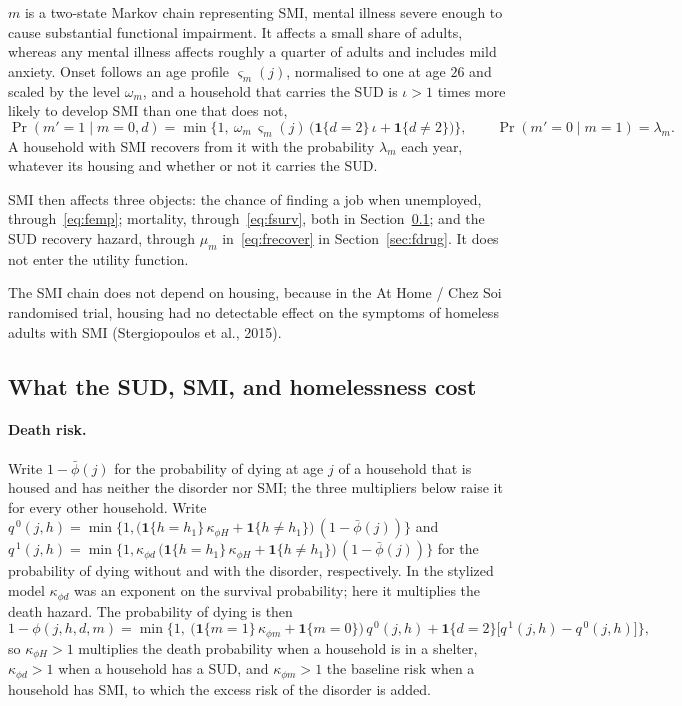 \documentclass[10pt]{article}
\begin{document}
$m$ is a two-state Markov chain representing SMI, mental illness severe enough to cause substantial functional impairment. It affects a small share of adults, whereas any
mental illness affects roughly a quarter of adults and includes mild anxiety. Onset
follows an age profile $\varsigma_m(j)$, normalised to one at age $26$ and scaled by the level
$\omega_m$, and a household that carries the SUD is $\iota>1$ times more likely to develop SMI than one that does not,
\begin{equation}\label{eq:fonset}
\Pr(m'=1\mid m=0,d)=\min\big\{1,\ \omega_m\,\varsigma_m(j)\,\big(\mathbf{1}\{d=2\}\,\iota+\mathbf{1}\{d\neq2\}\big)\big\},
\qquad
\Pr(m'=0\mid m=1)=\lambda_m .
\end{equation}
A household with SMI recovers from it with the probability $\lambda_m$ each year, whatever its housing and whether or not it carries the SUD.

SMI then affects three objects: the chance of finding a job when unemployed, through~\eqref{eq:femp}; mortality, through~\eqref{eq:fsurv}, both in
Section~\ref{sec:fcosts}; and the SUD recovery hazard, through $\mu_m$
in~\eqref{eq:frecover} in Section~\ref{sec:fdrug}. It does not enter the utility function.

The SMI chain does not depend on housing, because in the At Home / Chez Soi randomised trial, housing had no detectable effect on the symptoms of homeless adults with SMI (Stergiopoulos et al., 2015).

\subsection{What the SUD, SMI, and homelessness cost}\label{sec:fcosts}

\paragraph{Death risk.}\label{sec:fdeath} Write $1-\bar\phi(j)$ for the probability of dying
at age $j$ of a household that is housed and has neither the disorder nor SMI; the three
multipliers below raise it for every other household. Write
$q^{\,0}(j,h)=\min\{1,\big(\mathbf{1}\{h=h_1\}\,\kappa_{\phi H}+\mathbf{1}\{h\neq h_1\}\big)\,(1-\bar\phi(j))\}$ and
$q^{\,1}(j,h)=\min\{1,\kappa_{\phi d}\,\big(\mathbf{1}\{h=h_1\}\,\kappa_{\phi H}+\mathbf{1}\{h\neq h_1\}\big)\,(1-\bar\phi(j))\}$
for the probability of dying without and with the disorder, respectively. In the stylized model $\kappa_{\phi d}$ was an exponent on the survival probability; here it multiplies the death hazard. The probability of dying is then
\begin{equation}\label{eq:fsurv}
1-\phi(j,h,d,m)=\min\Big\{1,\ \big(\mathbf{1}\{m=1\}\,\kappa_{\phi m}+\mathbf{1}\{m=0\}\big)\,q^{\,0}(j,h)
+\mathbf{1}\{d=2\}\big[q^{\,1}(j,h)-q^{\,0}(j,h)\big]\Big\},
\end{equation}
so $\kappa_{\phi H}{}>1$ multiplies the death probability when a household is in a shelter, $\kappa_{\phi d}{}>1$ when a household has a SUD, and $\kappa_{\phi m}>1$ the baseline risk when a household has SMI, to which the excess risk of the disorder is
added.
\end{document}
